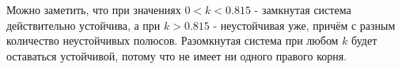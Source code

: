 Можно заметить, что при значениях $0 < k < 0.815$ - замкнутая система действительно устойчива, а при $k > 0.815$ - неустойчивая уже, причём с разным количество неустойчивых полюсов.
Разомкнутая система при любом $k$ будет оставаться устойчивой, потому что не имеет ни одного правого корня.



\endinput